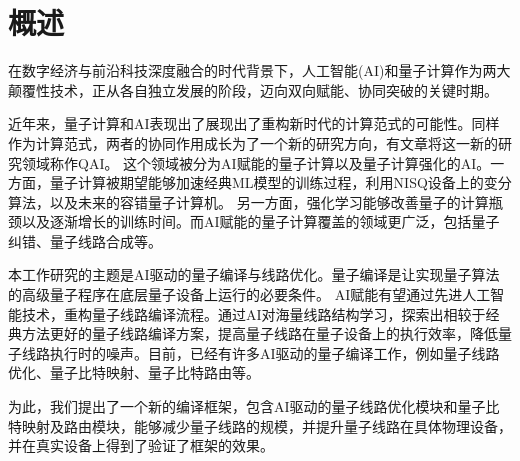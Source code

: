 \newpage
\section{概述}


在数字经济与前沿科技深度融合的时代背景下，人工智能(AI)和量子计算作为两大颠覆性技术，正从各自独立发展的阶段，迈向双向赋能、协同突破的关键时期。

近年来，量子计算和AI表现出了展现出了重构新时代的计算范式的可能性。同样作为计算范式，两者的协同作用成长为了一个新的研究方向\cite{carleo2019machine}，有文章将这一新的研究领域称作QAI\cite{acampora2025quantum}。
这个领域被分为AI赋能的量子计算以及量子计算强化的AI。一方面，量子计算被期望能够加速经典ML模型的训练过程，利用NISQ设备上的变分算法，以及未来的容错量子计算机。
另一方面，强化学习能够改善量子的计算瓶颈以及逐渐增长的训练时间\cite{meyer2022survey}。而AI赋能的量子计算覆盖的领域更广泛，包括量子纠错\cite{overwater2022neural}、量子线路合成等。

本工作研究的主题是AI驱动的量子编译与线路优化。量子编译是让实现量子算法的高级量子程序在底层量子设备上运行的必要条件。
AI赋能有望通过先进人工智能技术，重构量子线路编译流程。通过AI对海量线路结构学习，探索出相较于经典方法更好的量子线路编译方案，提高量子线路在量子设备上的执行效率，降低量子线路执行时的噪声。目前，已经有许多AI驱动的量子编译工作，例如量子线路优化\cite{li2024quarl}、量子比特映射\cite{acampora2021deep,li2023quantum}、量子比特路由等。

为此，我们提出了一个新的编译框架，包含AI驱动的量子线路优化模块和量子比特映射及路由模块，能够减少量子线路的规模，并提升量子线路在具体物理设备，并在真实设备上得到了验证了框架的效果。
